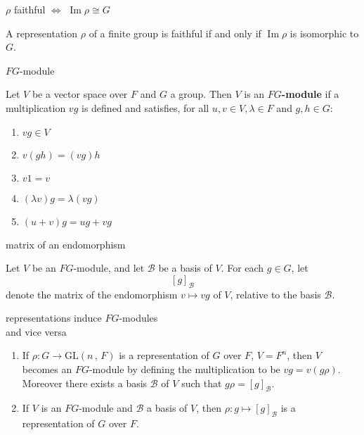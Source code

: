 \documentclass[avery5371,grid]{flashcards}
\newcommand{\B}{\mathscr{B}}
\newcommand{\iso}{\cong}
\newcommand{\GLnF}[2]{\ensuremath{\textrm{GL} \left( #1 \, , \, #2 \right)}}
\DeclareMathOperator{\Img}{\ensuremath{\textrm{Im}}}
\newcommand{\defn}[1]{\textbf{#1}}
\begin{document}
\begin{flashcard}[Proposition]{$\rho$ faithful $\Leftrightarrow$
    $\Img \rho \iso G$ }

  A representation $\rho$ of a finite group is faithful if and only if
  $\Img \rho$ is isomorphic to $G$.

\end{flashcard}

\begin{flashcard}[Definition]{$FG$-module}

  Let $V$ be a vector space over $F$ and $G$ a group. Then $V$ is an
  \defn{$FG$-module} if a multiplication $vg$ is defined and satisfies,
  for all $u,v \in V, \lambda \in F$ and $g, h \in G$:
  \begin{enumerate}
  \item $vg \in V$
  \item $v(gh) = (vg)h$
  \item $v1 = v$
  \item $(\lambda v)g = \lambda(vg)$
  \item $(u+v)g = ug + vg$
  \end{enumerate}

\end{flashcard}

\begin{flashcard}[Definition]{matrix of an endomorphism}

  Let $V$ be an $FG$-module, and let $\B$ be a basis of $V$. For each
  $g\in G$, let
  \[
    [g]_{\B}
  \]
  denote the matrix of the endomorphism $v \mapsto vg$ of $V$,
  relative to the basis $\B$.

\end{flashcard}

\begin{flashcard}[Theorem 4.4]{representations induce $FG$-modules \\
    and vice versa}

  \begin{enumerate}
  \item If $\rho: G \to \GLnF{n}{F}$ is a representation of $G$ over
    $F$, $V=F^n$, then $V$ becomes an $FG$-module by defining the
    multiplication to be $vg = v(g\rho)$. Moreover there exists a
    basis $\B$ of $V$ such that $g\rho = [g]_{\B}$.

  \item If $V$ is an $FG$-module and $\B$ a basis of $V$, then
    $\rho: g \mapsto [g]_{\B}$ is  a representation of $G$ over $F$.
  \end{enumerate}

\end{flashcard}
\end{document}
